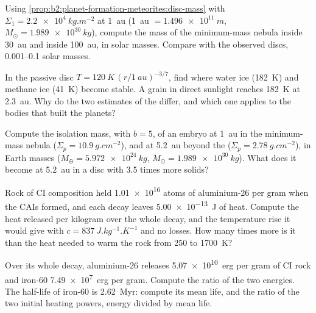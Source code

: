 \begin{exercise}[$\star\star$]\label{exo:b2:planet-formation-meteorites:5}
Using \cref{prop:b2:planet-formation-meteorites:disc-mass} with
$\Sigma_1 = \qty{2.2e4}{kg.m^{-2}}$ at \qty{1}{au} (\qty{1}{au} $=
\qty{1.496e11}{m}$, $M_\odot = \qty{1.989e30}{kg}$), compute the mass of the
minimum-mass nebula inside \qty{30}{au} and inside \qty{100}{au}, in solar
masses. Compare with the observed discs, \numrange{0.001}{0.1} solar masses.
\end{exercise}

\begin{exercise}[$\star\star$]\label{exo:b2:planet-formation-meteorites:6}
In the passive disc $T = \qty{120}{K}\,(r/\qty{1}{au})^{-3/7}$, find where water
ice (\qty{182}{K}) and methane ice (\qty{41}{K}) become stable. A grain in direct
sunlight reaches \qty{182}{K} at \qty{2.3}{au}. Why do the two estimates of the
 differ, and which one applies to the bodies that built the planets?
\end{exercise}

\begin{exercise}[$\star\star$]\label{exo:b2:planet-formation-meteorites:7}
Compute the isolation mass, with $b = 5$, of an embryo at \qty{1}{au} in the
minimum-mass nebula ($\Sigma_p = \qty{10.9}{g.cm^{-2}}$), and at \qty{5.2}{au}
beyond the  ($\Sigma_p = \qty{2.78}{g.cm^{-2}}$), in Earth masses
($M_\oplus = \qty{5.972e24}{kg}$, $M_\odot = \qty{1.989e30}{kg}$). What does it
become at \qty{5.2}{au} in a disc with \num{3.5} times more solids?
\end{exercise}

\begin{exercise}[$\star\star$]\label{exo:b2:planet-formation-meteorites:8}
Rock of CI composition held \num{1.01e16} atoms of aluminium-26 per gram when
the CAIs formed, and each decay leaves \qty{5.00e-13}{J} of heat. Compute the
heat released per kilogram over the whole decay, and the temperature rise it
would give with $c = \qty{837}{J.kg^{-1}.K^{-1}}$ and no losses. How many times
more is it than the heat needed to warm the rock from \num{250} to
\qty{1700}{K}?
\end{exercise}

\begin{exercise}[$\star\star$]\label{exo:b2:planet-formation-meteorites:9}
Over its whole decay, aluminium-26 releases \qty{5.07e10}{erg} per gram of CI
rock and iron-60 \qty{7.49e7}{erg} per gram. Compute the ratio of the two
energies. The half-life of iron-60 is \qty{2.62}{Myr}: compute its mean life,
and the ratio of the two initial heating powers, energy divided by mean life.
\end{exercise}

